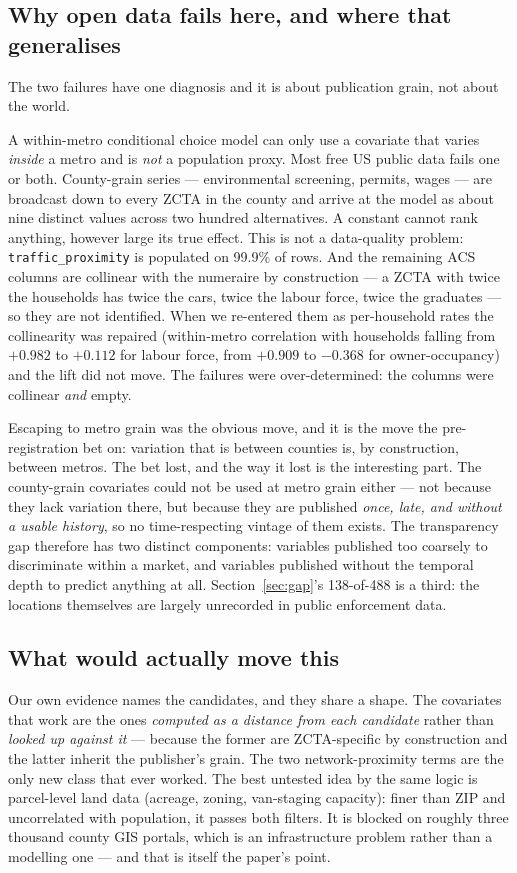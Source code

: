 \documentclass[conference]{IEEEtran}
\begin{document}
\subsection{Why open data fails here, and where that generalises}

The two failures have one diagnosis and it is about publication grain, not
about the world.

A within-metro conditional choice model can only use a covariate that varies
\emph{inside} a metro and is \emph{not} a population proxy. Most free US
public data fails one or both. County-grain series --- environmental
screening, permits, wages --- are broadcast down to every ZCTA in the county
and arrive at the model as about nine distinct values across two hundred
alternatives. A constant cannot rank anything, however large its true effect.
This is not a data-quality problem: \texttt{traffic\_proximity} is populated on
99.9\% of rows. And the remaining ACS columns are collinear with the numeraire
by construction --- a ZCTA with twice the households has twice the cars, twice
the labour force, twice the graduates --- so they are not identified. When we
re-entered them as per-household rates the collinearity was repaired
(within-metro correlation with households falling from $+0.982$ to $+0.112$ for
labour force, from $+0.909$ to $-0.368$ for owner-occupancy) and the lift did
not move. The failures were over-determined: the columns were collinear
\emph{and} empty.

Escaping to metro grain was the obvious move, and it is the move the
pre-registration bet on: variation that is between counties is, by
construction, between metros. The bet lost, and the way it lost is the
interesting part. The county-grain covariates could not be used at metro grain
either --- not because they lack variation there, but because they are
published \emph{once, late, and without a usable history}, so no
time-respecting vintage of them exists. The transparency gap therefore has two
distinct components: variables published too coarsely to discriminate within a
market, and variables published without the temporal depth to predict anything
at all. Section~\ref{sec:gap}'s 138-of-488 is a third: the locations
themselves are largely unrecorded in public enforcement data.

\subsection{What would actually move this}

Our own evidence names the candidates, and they share a shape. The covariates
that work are the ones \emph{computed as a distance from each candidate}
rather than \emph{looked up against it} --- because the former are
ZCTA-specific by construction and the latter inherit the publisher's grain.
The two network-proximity terms are the only new class that ever worked. The
best untested idea by the same logic is parcel-level land data (acreage, zoning,
van-staging capacity): finer than ZIP and uncorrelated with population, it
passes both filters. It is blocked on roughly three thousand county GIS
portals, which is an infrastructure problem rather than a modelling one --- and
that is itself the paper's point.
\end{document}
